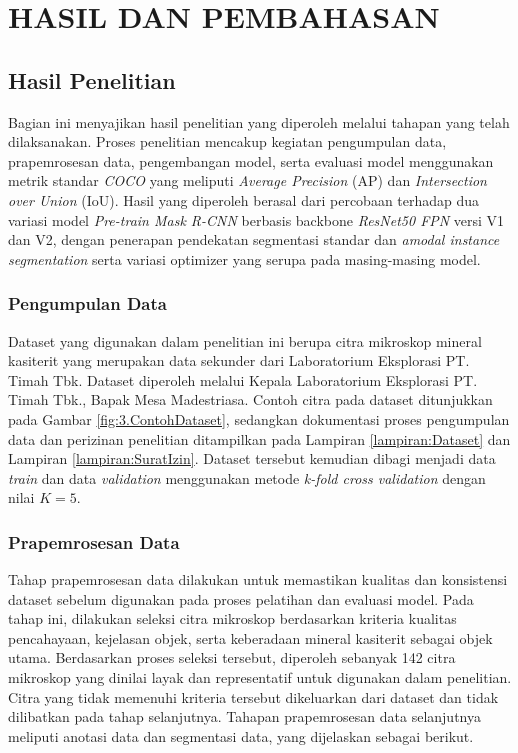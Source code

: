\newpage
\chapter{HASIL DAN PEMBAHASAN} \label{Bab IV}

\section{Hasil Penelitian} \label{IV.Hasil}
Bagian ini menyajikan hasil penelitian yang diperoleh melalui tahapan yang telah dilaksanakan. Proses penelitian mencakup kegiatan pengumpulan data, prapemrosesan data, pengembangan model, serta evaluasi model menggunakan metrik standar \textit{COCO} yang meliputi \textit{Average Precision} (AP) dan \textit{Intersection over Union} (IoU). Hasil yang diperoleh berasal dari percobaan terhadap dua variasi model \textit{Pre-train Mask R-CNN} berbasis backbone \textit{ResNet50 FPN} versi V1 dan V2, dengan penerapan pendekatan segmentasi standar dan \textit{amodal instance segmentation} serta variasi optimizer yang serupa pada masing-masing model. \par

\subsection{Pengumpulan Data} \label{IV.Pengumpulan_Data}
Dataset yang digunakan dalam penelitian ini berupa citra mikroskop mineral kasiterit yang merupakan data sekunder dari Laboratorium Eksplorasi PT. Timah Tbk. Dataset diperoleh melalui Kepala Laboratorium Eksplorasi PT. Timah Tbk., Bapak Mesa Madestriasa. Contoh citra pada dataset ditunjukkan pada Gambar \ref{fig:3.ContohDataset}, sedangkan dokumentasi proses pengumpulan data dan perizinan penelitian ditampilkan pada Lampiran \ref{lampiran:Dataset} dan Lampiran \ref{lampiran:SuratIzin}. Dataset tersebut kemudian dibagi menjadi data \textit{train} dan data \textit{validation} menggunakan metode \textit{k-fold cross validation} dengan nilai $K=5$. \par

\subsection{Prapemrosesan Data} \label{IV.Prapemrosesan_Data}
Tahap prapemrosesan data dilakukan untuk memastikan kualitas dan konsistensi dataset sebelum digunakan pada proses pelatihan dan evaluasi model. Pada tahap ini, dilakukan seleksi citra mikroskop berdasarkan kriteria kualitas pencahayaan, kejelasan objek, serta keberadaan mineral kasiterit sebagai objek utama. Berdasarkan proses seleksi tersebut, diperoleh sebanyak 142 citra mikroskop yang dinilai layak dan representatif untuk digunakan dalam penelitian. Citra yang tidak memenuhi kriteria tersebut dikeluarkan dari dataset dan tidak dilibatkan pada tahap selanjutnya. Tahapan prapemrosesan data selanjutnya meliputi anotasi data dan segmentasi data, yang dijelaskan sebagai berikut.

